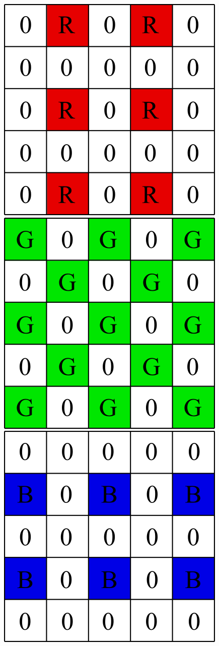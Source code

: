 \documentclass[a4paper,12pt]{report}
\begin{document}
\begin{figure}[!ht]
	\center
	\includegraphics[scale=1.0]{./image/phi_r_cfa_export.png}
	\includegraphics[scale=1.0]{./image/phi_g_cfa_export.png}
	\includegraphics[scale=1.0]{./image/phi_b_cfa_export.png}

\end{figure}
\end{document}

